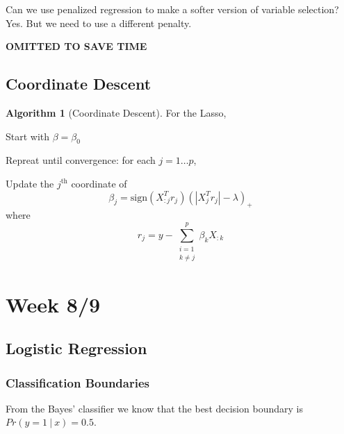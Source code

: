 \documentclass[11pt]{article}
\newenvironment{indentone}{\begin{adjustwidth}{3em}{0em}}{\end{adjustwidth}}
\theoremstyle{definition}
\newtheorem{algorithm}{Algorithm}[section]
\numberwithin{equation}{section}
\begin{document}
\begin{writenotes}
  Can we use penalized regression to make a softer version of variable selection? Yes. But we need to use a different penalty.
\end{writenotes}

\textbf{OMITTED TO SAVE TIME}

\subsection{Coordinate Descent}

\begin{algorithm}[Coordinate Descent]
For the Lasso,

  \begin{enumerate}
    \item Start with $\beta = \beta_0$
    \item Repreat until convergence: for each $j=1\dots p$,
    \begin{indentone}
      \item Update the $j^{\text{th}}$ coordinate of
      \begin{equation}
        \beta_j = \text{sign}(X^T_{:j}r_j)\left( |X^T_jr_j| - \lambda \right)_+
      \end{equation}
      where
      \begin{equation}
      r_j = y - \sum^p_{\substack{i=1\\k\neq j}}\beta_k X_{:k}
      \end{equation}
    \end{indentone}
  \end{enumerate}
\end{algorithm}


\newpage

\section{Week 8/9}
\subsection{Logistic Regression}
\subsubsection{Classification Boundaries}

 From the Bayes' classifier we know that the best decision boundary is $Pr(y=1\>|\>x)=0.5$.
\end{document}
